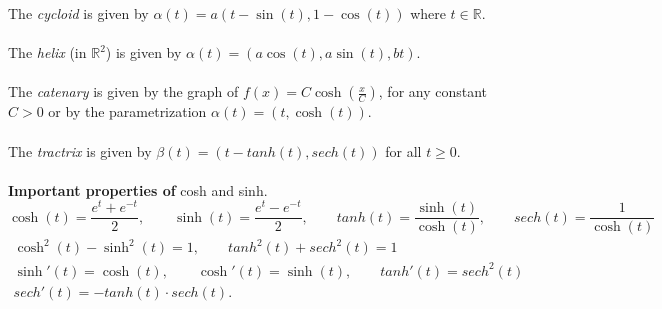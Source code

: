 \documentclass{article}
\begin{document}
    The \textit{cycloid} is given by $\alpha(t) = a(t-\sin{(t)}, 1-\cos{(t)})$ where $t\in\mathbb{R}$.\\\\
    The \textit{helix} (in $\mathbb{R}^2$) is given by $\alpha(t) = (a\cos{(t)},a\sin{(t)},bt)$.\\\\
    The \textit{catenary} is given by the graph of $f(x) = C\cosh{(\frac{x}{C})}$, for any constant $C>0$ or by the
    parametrization $\alpha(t) = (t,\cosh(t))$.\\\\
    The \textit{tractrix} is given by $\beta(t) = (t-tanh(t),sech(t))$ for all $t\geq 0$.\\\\
    \newpage
    \textbf{Important properties of} cosh and sinh.
    \[ \cosh(t) = \frac{e^t + e^{-t}}{2},\qquad \sinh(t) = \frac{e^t - e^{-t}}{2},\qquad tanh(t) = \frac{\sinh(t)}{\cosh(t)},
        \qquad sech(t) = \frac{1}{\cosh(t)}\]
    \begin{align*}
        \cosh^2(t) - \sinh^2(t) = 1,\qquad tanh^2(t) + sech^2(t) = 1 \\
        \sinh'(t)  = \cosh(t),\qquad \cosh'(t) = \sinh(t),\qquad tanh'(t) = sech^2(t)\\
        sech'(t) = -tanh(t)\cdot sech(t).
    \end{align*}
\end{document}
